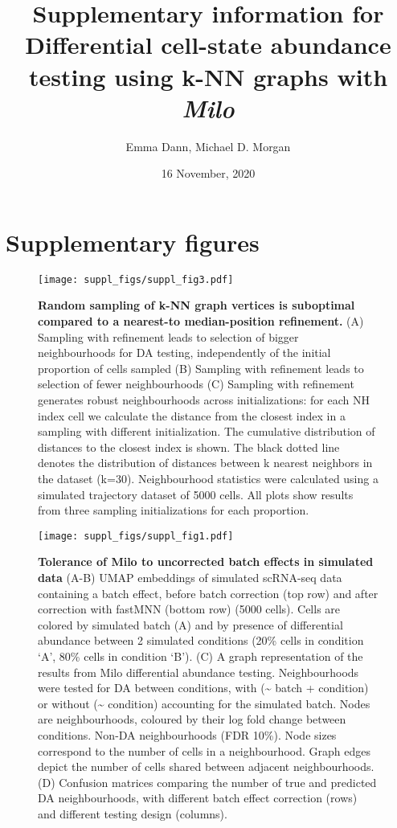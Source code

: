 \documentclass[
]{article}
\title{Supplementary information for
\textbf{Differential cell-state abundance testing using k-NN graphs with \emph{Milo}}}
\author{Emma Dann, Michael D. Morgan}
\date{16 November, 2020}
\begin{document}
\maketitle

{
\setcounter{tocdepth}{3}
\tableofcontents
}
\renewcommand{\figurename}{Supplementary Figure}

\newpage

\hypertarget{supplementary-figures}{%
\section{Supplementary figures}\label{supplementary-figures}}

\begin{figure}
\centering
\texttt{[image: suppl\_figs/suppl\_fig3.pdf]}
\caption{\label{fig:sup-fig-3}\textbf{Random sampling of k-NN graph vertices is suboptimal compared to a nearest-to median-position refinement.}
(A) Sampling with refinement leads to selection of bigger neighbourhoods for DA testing, independently of the initial proportion of cells sampled
(B) Sampling with refinement leads to selection of fewer neighbourhoods
(C) Sampling with refinement generates robust neighbourhoods across initializations: for each NH index cell we calculate the distance from the closest index in a sampling with different initialization. The cumulative distribution of distances to the closest index is shown. The black dotted line denotes the distribution of distances between k nearest neighbors in the dataset (k=30).
Neighbourhood statistics were calculated using a simulated trajectory dataset of 5000 cells. All plots show results from three sampling initializations for each proportion.}
\end{figure}







\begin{figure}
\centering
\texttt{[image: suppl\_figs/suppl\_fig1.pdf]}
\caption{\label{fig:sup-fig-1}\textbf{Tolerance of Milo to uncorrected batch effects in simulated data}
(A-B) UMAP embeddings of simulated scRNA-seq data containing a batch effect, before batch correction (top row) and after correction with fastMNN (bottom row) (5000 cells). Cells are colored by simulated batch (A) and by presence of differential abundance between 2 simulated conditions (20\% cells in condition `A', 80\% cells in condition `B').
(C) A graph representation of the results from Milo differential abundance testing. Neighbourhoods were tested for DA between conditions, with (\textasciitilde{} batch + condition) or without (\textasciitilde{} condition) accounting for the simulated batch. Nodes are neighbourhoods, coloured by their log fold change between conditions. Non-DA neighbourhoods (FDR 10\%). Node sizes correspond to the number of cells in a neighbourhood. Graph edges depict the number of cells shared between adjacent neighbourhoods.
(D) Confusion matrices comparing the number of true and predicted DA neighbourhoods, with different batch effect correction (rows) and different testing design (columns).}
\end{figure}
\end{document}
